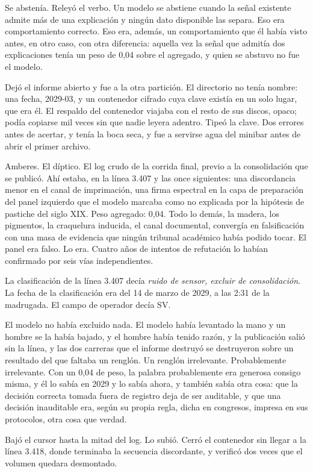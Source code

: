 Se abstenía. Releyó el verbo. Un modelo se abstiene cuando la señal existente admite más de una explicación y ningún dato disponible las separa. Eso era comportamiento correcto. Eso era, además, un comportamiento que él había visto antes, en otro caso, con otra diferencia: aquella vez la señal que admitía dos explicaciones tenía un peso de 0,04 sobre el agregado, y quien se abstuvo no fue el modelo.

Dejó el informe abierto y fue a la otra partición. El directorio no tenía nombre: una fecha, 2029-03, y un contenedor cifrado cuya clave existía en un solo lugar, que era él. El respaldo del contenedor viajaba con el resto de sus discos, opaco; podía copiarse mil veces sin que nadie leyera adentro. Tipeó la clave. Dos errores antes de acertar, y tenía la boca seca, y fue a servirse agua del minibar antes de abrir el primer archivo.

Amberes. El díptico. El log crudo de la corrida final, previo a la consolidación que se publicó. Ahí estaba, en la línea 3.407 y las once siguientes: una discordancia menor en el canal de imprimación, una firma espectral en la capa de preparación del panel izquierdo que el modelo marcaba como no explicada por la hipótesis de pastiche del siglo XIX. Peso agregado: 0,04. Todo lo demás, la madera, los pigmentos, la craquelura inducida, el canal documental, convergía en falsificación con una masa de evidencia que ningún tribunal académico había podido tocar. El panel era falso. Lo era. Cuatro años de intentos de refutación lo habían confirmado por seis vías independientes.

La clasificación de la línea 3.407 decía \textit{ruido de sensor, excluir de consolidación}. La fecha de la clasificación era del 14 de marzo de 2029, a las 2:31 de la madrugada. El campo de operador decía SV.

El modelo no había excluido nada. El modelo había levantado la mano y un hombre se la había bajado, y el hombre había tenido razón, y la publicación salió sin la línea, y las dos carreras que el informe destruyó se destruyeron sobre un resultado del que faltaba un renglón. Un renglón irrelevante. Probablemente irrelevante. Con un 0,04 de peso, la palabra probablemente era generosa consigo misma, y él lo sabía en 2029 y lo sabía ahora, y también sabía otra cosa: que la decisión correcta tomada fuera de registro deja de ser auditable, y que una decisión inauditable era, según su propia regla, dicha en congresos, impresa en sus protocolos, otra cosa que verdad.

Bajó el cursor hasta la mitad del log. Lo subió. Cerró el contenedor sin llegar a la línea 3.418, donde terminaba la secuencia discordante, y verificó dos veces que el volumen quedara desmontado.


